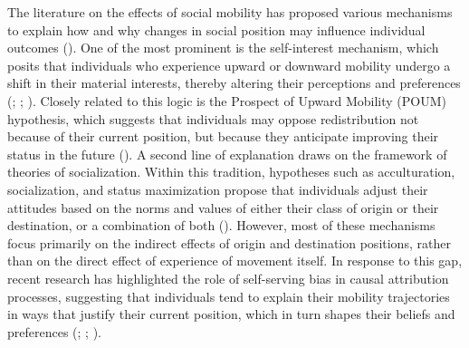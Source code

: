 \documentclass[
  12pt,
]{article}
\begin{document}
The literature on the effects of social mobility has proposed various
mechanisms to explain how and why changes in social position may
influence individual outcomes
(). One of the
most prominent is the self-interest mechanism, which posits that
individuals who experience upward or downward mobility undergo a shift
in their material interests, thereby altering their perceptions and
preferences (;
;
).
Closely related to this logic is the Prospect of Upward Mobility (POUM)
hypothesis, which suggests that individuals may oppose redistribution
not because of their current position, but because they anticipate
improving their status in the future
(). A second line
of explanation draws on the framework of theories of socialization.
Within this tradition, hypotheses such as acculturation, socialization,
and status maximization propose that individuals adjust their attitudes
based on the norms and values of either their class of origin or their
destination, or a combination of both
(). However, most of these mechanisms focus
primarily on the indirect effects of origin and destination positions,
rather than on the direct effect of experience of movement itself. In
response to this gap, recent research has highlighted the role of
self-serving bias in causal attribution processes, suggesting that
individuals tend to explain their mobility trajectories in ways that
justify their current position, which in turn shapes their beliefs and
preferences
(;
;
).
\end{document}
